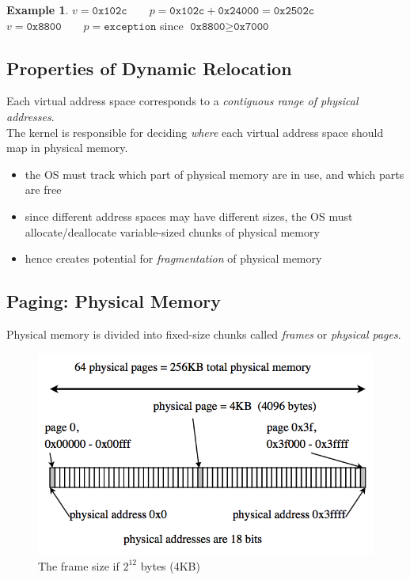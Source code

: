 \documentclass[12pt]{article}
\theoremstyle{plain}
\theoremstyle{definition}
\newtheorem*{ex*}{Example}
\begin{document}
\begin{ex*}
$v = \texttt{0x102c} \qquad p = \texttt{0x102c} + \texttt{0x24000} = \texttt{0x2502c}$ \\
$v = \texttt{0x8800} \qquad p = \texttt{exception}$ since $\texttt{0x8800} \geq \texttt{0x7000}$
\end{ex*}

\subsection{Properties of Dynamic Relocation}
Each virtual address space corresponds to a \emph{contiguous range of physical addresses}. \\
The kernel is responsible for deciding \emph{where} each virtual address space should map in physical memory.
\begin{itemize}
  \item the OS must track which part of physical memory are in use, and which parts are free
  \item since different address spaces may have different sizes, the OS must allocate/deallocate variable-sized chunks of physical memory
  \item hence creates potential for \emph{fragmentation} of physical memory
\end{itemize}

\subsection{Paging: Physical Memory}
Physical memory is divided into fixed-size chunks called \emph{frames} or \emph{physical pages}.
\begin{figure}[!h]
  \centering
  \includegraphics[scale=0.7]{pictures/paging_phys_mem.png}
  \caption{The frame size if $2^{12}$ bytes (4KB)}
  \label{fig:p_phys_mem}
\end{figure}
\end{document}
